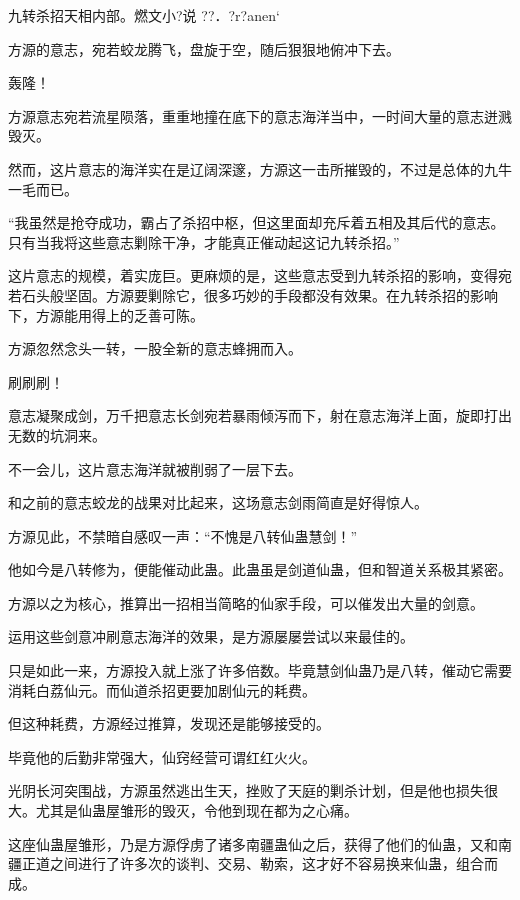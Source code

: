
\begin{this_body}

九转杀招天相内部。燃文小?说    ??．?r?anen`

方源的意志，宛若蛟龙腾飞，盘旋于空，随后狠狠地俯冲下去。

轰隆！

方源意志宛若流星陨落，重重地撞在底下的意志海洋当中，一时间大量的意志迸溅毁灭。

然而，这片意志的海洋实在是辽阔深邃，方源这一击所摧毁的，不过是总体的九牛一毛而已。

“我虽然是抢夺成功，霸占了杀招中枢，但这里面却充斥着五相及其后代的意志。只有当我将这些意志剿除干净，才能真正催动起这记九转杀招。”

这片意志的规模，着实庞巨。更麻烦的是，这些意志受到九转杀招的影响，变得宛若石头般坚固。方源要剿除它，很多巧妙的手段都没有效果。在九转杀招的影响下，方源能用得上的乏善可陈。

方源忽然念头一转，一股全新的意志蜂拥而入。

刷刷刷！

意志凝聚成剑，万千把意志长剑宛若暴雨倾泻而下，射在意志海洋上面，旋即打出无数的坑洞来。

不一会儿，这片意志海洋就被削弱了一层下去。

和之前的意志蛟龙的战果对比起来，这场意志剑雨简直是好得惊人。

方源见此，不禁暗自感叹一声：“不愧是八转仙蛊慧剑！”

他如今是八转修为，便能催动此蛊。此蛊虽是剑道仙蛊，但和智道关系极其紧密。

方源以之为核心，推算出一招相当简略的仙家手段，可以催发出大量的剑意。

运用这些剑意冲刷意志海洋的效果，是方源屡屡尝试以来最佳的。

只是如此一来，方源投入就上涨了许多倍数。毕竟慧剑仙蛊乃是八转，催动它需要消耗白荔仙元。而仙道杀招更要加剧仙元的耗费。

但这种耗费，方源经过推算，发现还是能够接受的。

毕竟他的后勤非常强大，仙窍经营可谓红红火火。

光阴长河突围战，方源虽然逃出生天，挫败了天庭的剿杀计划，但是他也损失很大。尤其是仙蛊屋雏形的毁灭，令他到现在都为之心痛。

这座仙蛊屋雏形，乃是方源俘虏了诸多南疆蛊仙之后，获得了他们的仙蛊，又和南疆正道之间进行了许多次的谈判、交易、勒索，这才好不容易换来仙蛊，组合而成。


\end{this_body}
